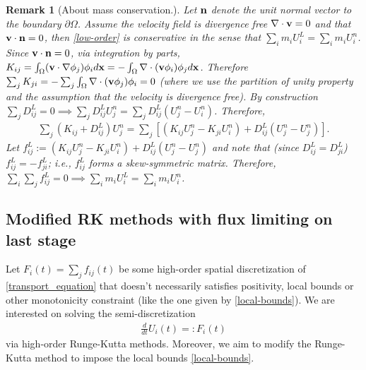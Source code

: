 \documentclass{article}
\newtheorem{remark}{Remark}
\numberwithin{remark}{subsection}
\newcommand{\bfv}{{\bf v}}
\newcommand{\bfn}{{\bf n}}
\newcommand{\bfx}{{\bf x}}
\begin{document}
\begin{remark}[About mass conservation.]\label{remark:conservation_low-order}
  Let $\bfn$ denote the unit normal vector to the boundary $\partial\Omega$.
  Assume the velocity field is divergence free $\nabla\cdot \bfv=0$ and that $\bfv\cdot \bfn=0$,
  then \eqref{low-order} is conservative in the sense that
  $\sum_i m_i U_i^L=\sum_i m_i U_i^n$. Since $\bfv\cdot \bfn=0$, via integration by parts,
  $K_{ij}=\int_\Omega (\bfv\cdot\nabla \phi_j)\phi_i d\bfx = -\int_\Omega\nabla\cdot(\bfv\phi_i)\phi_jd\bfx$. Therefore $\sum_j K_{ji}=-\sum_j\int_\Omega \nabla\cdot(\bfv\phi_j)\phi_i=0$
  (where we use the partition of unity property and
  the assumption that the velocity is divergence free).
  By construction $\sum_jD_{ij}^L=0\implies \sum_j D_{ij}^L U_j^n=\sum_jD_{ij}^L (U_j^n-U_i^n)$.
  Therefore,
  \begin{align*}
    \sum_j (K_{ij}+D_{ij}^L)U_j^n =
    \sum_j \left[(K_{ij}U_j^n - K_{ji}U_i^n) + D_{ij}^L(U_j^n-U_j^n)\right].
  \end{align*}
  Let $f_{ij}^L:=(K_{ij}U_j^n - K_{ji}U_i^n) + D_{ij}^L(U_j^n-U_j^n)$
  and note that (since $D^L_{ij}=D_{ji}^L$)
  $f_{ij}^L=-f_{ji}^L$; i.e., $f_{ij}^L$ forms a skew-symmetric matrix.
  Therefore, $\sum_i\sum_j f_{ij}^L=0\implies\sum_i m_i U_i^L=\sum_i m_i U_i^n$.
\end{remark}

\subsection{Modified RK methods with flux limiting on last stage}
Let $F_i(t)=\sum_j f_{ij}(t)$ be some high-order spatial discretization of
\eqref{transport_equation}
that doesn't necessarily satisfies positivity, local bounds or other monotonicity constraint
(like the one given by \eqref{local-bounds}).
%
We are interested on solving the semi-discretization
\begin{align}
  \frac{d}{dt} U_i(t)=:F_i(t) %
\end{align}
via high-order Runge-Kutta methods. Moreover, we aim to modify the Runge-Kutta method
to impose the local bounds \eqref{local-bounds}.
\end{document}
